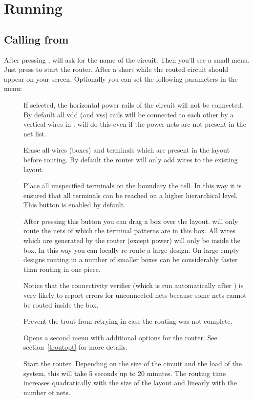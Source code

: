 \section{Running \protect{}}
\subsection{Calling \protect{} from \protect{}}
After pressing ,  will ask
for the name of the circuit. Then you'll see a small menu.
Just press  to start the router. After a short while
the routed circuit should appear on your screen.
Optionally you can set the following parameters in the
menu:
\begin{description}
\item[]
If selected, the horizontal power rails of the circuit will not be connected.
By default all vdd (and vss) rails will be connected to each other by a
vertical wires in .  will do this even if the power nets
are not present in the net list.
\item[]
Erase all wires (boxes) and terminals which are present in the layout before
routing. By default the router will only add wires to the existing layout.
\item[]
Place all unspecified terminals on the boundary the cell. In this way it is
ensured that all terminals can be reached on a higher hierarchical level. This
button is enabled by default.
\item[]
After pressing this button you can drag a box over the layout. 
will only route the nets of which the terminal patterns are in this box. All
wires which are generated by the router (except power) will only be inside the
box. In this way you can locally re-route a large design. On large empty
designs routing in a number of smaller boxes can be considerably faster than
routing in one piece.

Notice that the connectivity verifier (which is run
automatically after ) is very likely to report
errors for unconnected nets because some nets cannot be
routed inside the box.
\item[]
Prevent the trout from retrying in case the routing was not complete.
\item[]
Opens a second menu with additional options for the router.
See section~\ref{troutopt} for more details.
\item[]
Start the router. Depending on the size of the circuit and
the load of the system, this will take 5 seconds up to 20
minutes.  The routing time increases quadratically with the
size of the layout and linearly with the number of nets.
\end{description}

